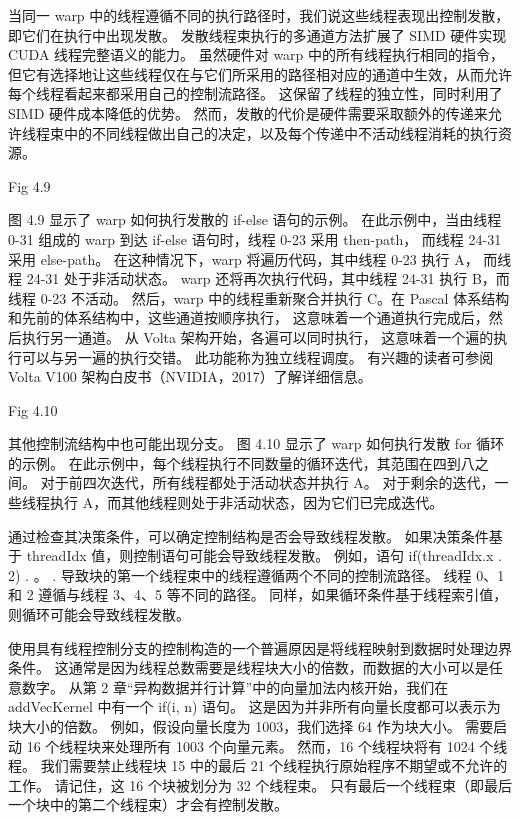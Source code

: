 当同一 warp 中的线程遵循不同的执行路径时，我们说这些线程表现出控制发散，即它们在执行中出现发散。 
发散线程束执行的多通道方法扩展了 SIMD 硬件实现 CUDA 线程完整语义的能力。 虽然硬件对 warp 中的所有线程执行相同的指令，
但它有选择地让这些线程仅在与它们所采用的路径相对应的通道中生效，从而允许每个线程看起来都采用自己的控制流路径。 
这保留了线程的独立性，同时利用了 SIMD 硬件成本降低的优势。 
然而，发散的代价是硬件需要采取额外的传递来允许线程束中的不同线程做出自己的决定，以及每个传递中不活动线程消耗的执行资源。

{\color{red} Fig 4.9}

图 4.9 显示了 warp 如何执行发散的 if-else 语句的示例。 
在此示例中，当由线程 0-31 组成的 warp 到达 if-else 语句时，线程 0-23 采用 then-path，
而线程 24-31 采用 else-path。 在这种情况下，warp 将遍历代码，其中线程 0-23 执行 A，
而线程 24-31 处于非活动状态。 warp 还将再次执行代码，其中线程 24-31 执行 B，而线程 0-23 不活动。 
然后，warp 中的线程重新聚合并执行 C。在 Pascal 体系结构和先前的体系结构中，这些通道按顺序执行，
这意味着一个通道执行完成后，然后执行另一通道。 从 Volta 架构开始，各遍可以同时执行，
这意味着一个遍的执行可以与另一遍的执行交错。 此功能称为独立线程调度。 
有兴趣的读者可参阅 Volta V100 架构白皮书（NVIDIA，2017）了解详细信息。

{\color{red} Fig 4.10}

其他控制流结构中也可能出现分支。 图 4.10 显示了 warp 如何执行发散 for 循环的示例。 
在此示例中，每个线程执行不同数量的循环迭代，其范围在四到八之间。 对于前四次迭代，所有线程都处于活动状态并执行 A。
对于剩余的迭代，一些线程执行 A，而其他线程则处于非活动状态，因为它们已完成迭代。

通过检查其决策条件，可以确定控制结构是否会导致线程发散。 如果决策条件基于 threadIdx 值，则控制语句可能会导致线程发散。 
例如，语句 if(threadIdx.x . 2) {. 。 .} 导致块的第一个线程束中的线程遵循两个不同的控制流路径。 
线程 0、1 和 2 遵循与线程 3、4、5 等不同的路径。 同样，如果循环条件基于线程索引值，则循环可能会导致线程发散。

使用具有线程控制分支的控制构造的一个普遍原因是将线程映射到数据时处理边界条件。 
这通常是因为线程总数需要是线程块大小的倍数，而数据的大小可以是任意数字。 
从第 2 章“异构数据并行计算”中的向量加法内核开始，我们在 addVecKernel 中有一个 if(i, n) 语句。 
这是因为并非所有向量长度都可以表示为块大小的倍数。 例如，假设向量长度为 1003，我们选择 64 作为块大小。 
需要启动 16 个线程块来处理所有 1003 个向量元素。 然而，16 个线程块将有 1024 个线程。 
我们需要禁止线程块 15 中的最后 21 个线程执行原始程序不期望或不允许的工作。 
请记住，这 16 个块被划分为 32 个线程束。 只有最后一个线程束（即最后一个块中的第二个线程束）才会有控制发散。

